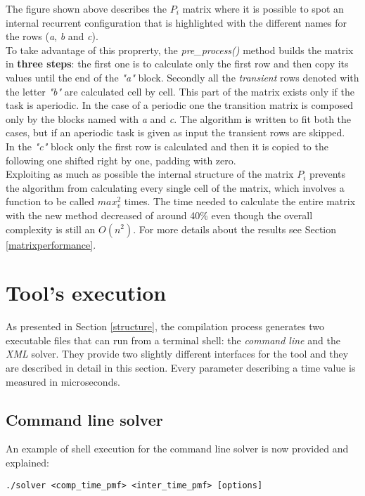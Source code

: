 The figure shown above describes the \( P_{i} \) matrix where it is possible to spot an internal recurrent configuration that is highlighted with the different names for the rows (\emph{a}, \emph{b} and \emph{c}).\\
To take advantage of this proprerty, the \emph{pre\_process()} method builds the matrix in \textbf{three steps}: the first one is to calculate only the first row and then copy its values until the end of the \emph{"a"} block. Secondly all the \emph{transient} rows denoted with the letter \emph{"b"} are calculated cell by cell. This part of the matrix exists only if the task is aperiodic. In the case of a periodic one the transition matrix is composed only by the blocks named with \emph{a} and \emph{c}. The algorithm is written to fit both the cases, but if an aperiodic task is given as input the transient rows are skipped.\\
In the \emph{"c"} block only the first row is calculated and then it is copied to the following one shifted right by one, padding with zero.\\
Exploiting as much as possible the internal structure of the matrix \( P_{i} \) prevents the algorithm from calculating every single cell of the matrix, which involves a function to be called \( max_{v}^{2} \) times. The time needed to calculate the entire matrix with the new method decreased of around 40\% even though the overall complexity is still an \( O(n^{2}) \). For more details about the results see Section \ref{matrixperformance}.

\section{Tool's execution}
As presented in Section \ref{structure}, the compilation process generates two executable files that can run from a terminal shell: the \emph{command line} and the \emph{XML} solver. They provide two slightly different interfaces for the tool and they are described in detail in this section. Every parameter describing a time value is measured in microseconds.

\subsection{Command line solver}
An example of shell execution for the command line solver is now provided and explained:
\begin{lstlisting}[frame=bt, numbers=none]
  ./solver <comp_time_pmf> <inter_time_pmf> [options]
\end{lstlisting}    

